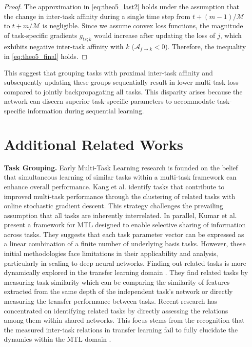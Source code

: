 \begin{proof}
The approximation in \cref{eq:theo5_last2} holds under the assumption that the change in inter-task affinity during a single time step from $t+(m-1)/\mathcal{M}$ to $t+m/\mathcal{M}$ is negligible. Since we assume convex loss functions, the magnitude of task-specific gradients $g_{ts;k}$ would increase after updating the loss of $j$, which exhibits negative inter-task affinity with $k$ ($\mathcal{A}_{j \rightarrow k}<0$). Therefore, the inequality in \cref{eq:theo5_final} holds.
\end{proof}

This suggest that grouping tasks with proximal inter-task affinity and subsequently updating these groups sequentially result in lower multi-task loss compared to jointly backpropagating all tasks. This disparity arises because the network can discern superior task-specific parameters to accommodate task-specific information during sequential learning.


\clearpage
\section{Additional Related Works}
\textbf{Task Grouping.} Early Multi-Task Learning research is founded on the belief that simultaneous learning of similar tasks within a multi-task framework can enhance overall performance. Kang et al. \cite{kang2011learning} identify tasks that contribute to improved multi-task performance through the clustering of related tasks with online stochastic gradient descent. This strategy challenges the prevailing assumption that all tasks are inherently interrelated. In parallel, Kumar et al. \cite{kumar2012learning} present a framework for MTL designed to enable selective sharing of information across tasks. They suggests that each task parameter vector can be expressed as a linear combination of a finite number of underlying basis tasks. However, these initial methodologies face limitations in their applicability and analysis, particularly in scaling to deep neural networks.
Finding out related tasks is more dynamically explored in the transfer learning domain \cite{achille2019task2vec, achille2021information}. They find related tasks by measuring task similarity which can be comparing the similarity of features extracted from the same depth of the independent task's network or directly measuring the transfer performance between tasks. Recent research has concentrated on identifying related tasks by directly assessing the relations among them within shared networks. This focus stems from the recognition that the measured inter-task relations in transfer learning fail to fully elucidate the dynamics within the MTL domain \cite{standley2020tasks, fifty2021efficiently}.

